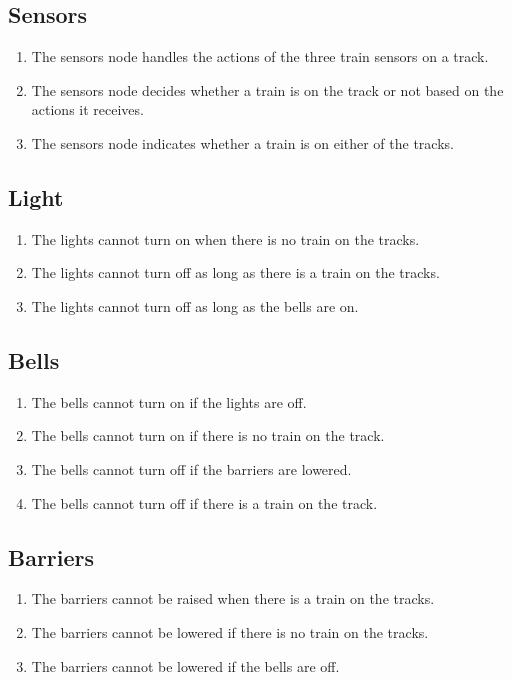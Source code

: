 \documentclass[final]{report}
\begin{document}
\subsection{Sensors}
	\begin{enumerate}
		\item The sensors node handles the actions of the three train sensors on a track.
		\item The sensors node decides whether a train is on the track or not based on the actions it receives.
		\item The sensors node indicates whether a train is on either of the tracks.
	\end{enumerate}

\subsection{Light}
	\begin{enumerate}
		\item The lights cannot turn on when there is no train on the tracks.
		\item The lights cannot turn off as long as there is a train on the tracks.
		\item The lights cannot turn off as long as the bells are on.
	\end{enumerate}

\subsection{Bells}
	\begin{enumerate}
		\item The bells cannot turn on if the lights are off.
		\item The bells cannot turn on if there is no train on the track.
		\item The bells cannot turn off if the barriers are lowered.
		\item The bells cannot turn off if there is a train on the track.
	\end{enumerate}

\subsection{Barriers}
	\begin{enumerate}
		\item The barriers cannot be raised when there is a train on the tracks.
		\item The barriers cannot be lowered if there is no train on the tracks.
		\item The barriers cannot be lowered if the bells are off.
	\end{enumerate}
	
\end{document}
